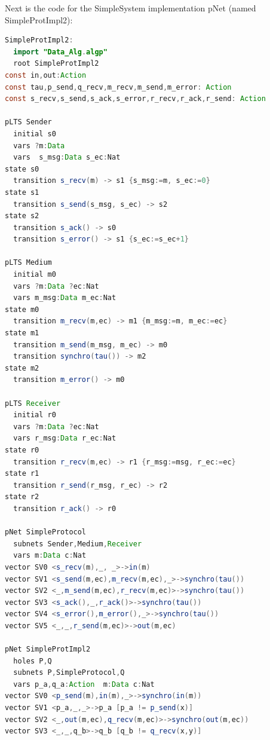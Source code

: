\documentclass{lmcs}
\begin{document}
Next is the code for the SimpleSystem implementation pNet (named SimpleProtImpl2):
\medskip
\begin{lstlisting}[basicstyle=\scriptsize\ttfamily, language=java, frame=single]
SimpleProtImpl2:
  import "Data_Alg.algp"
  root SimpleProtImpl2
const in,out:Action
const tau,p_send,q_recv,m_recv,m_send,m_error: Action
const s_recv,s_send,s_ack,s_error,r_recv,r_ack,r_send: Action

pLTS Sender
  initial s0
  vars ?m:Data
  vars  s_msg:Data s_ec:Nat
state s0
  transition s_recv(m) -> s1 {s_msg:=m, s_ec:=0}
state s1
  transition s_send(s_msg, s_ec) -> s2 
state s2
  transition s_ack() -> s0
  transition s_error() -> s1 {s_ec:=s_ec+1}

pLTS Medium
  initial m0
  vars ?m:Data ?ec:Nat
  vars m_msg:Data m_ec:Nat
state m0
  transition m_recv(m,ec) -> m1 {m_msg:=m, m_ec:=ec}
state m1
  transition m_send(m_msg, m_ec) -> m0 
  transition synchro(tau()) -> m2
state m2
  transition m_error() -> m0

pLTS Receiver
  initial r0
  vars ?m:Data ?ec:Nat
  vars r_msg:Data r_ec:Nat
state r0
  transition r_recv(m,ec) -> r1 {r_msg:=msg, r_ec:=ec}
state r1
  transition r_send(r_msg, r_ec) -> r2
state r2
  transition r_ack() -> r0

pNet SimpleProtocol
  subnets Sender,Medium,Receiver
  vars m:Data c:Nat
vector SV0 <s_recv(m),_, _>->in(m)
vector SV1 <s_send(m,ec),m_recv(m,ec),_>->synchro(tau())
vector SV2 <_,m_send(m,ec),r_recv(m,ec)>->synchro(tau())
vector SV3 <s_ack(),_,r_ack()>->synchro(tau())
vector SV4 <s_error(),m_error(),_>->synchro(tau())
vector SV5 <_,_,r_send(m,ec)>->out(m,ec)

pNet SimpleProtImpl2
  holes P,Q
  subnets P,SimpleProtocol,Q
  vars p_a,q_a:Action  m:Data c:Nat
vector SV0 <p_send(m),in(m),_>->synchro(in(m))
vector SV1 <p_a,_,_>->p_a [p_a != p_send(x)]
vector SV2 <_,out(m,ec),q_recv(m,ec)>->synchro(out(m,ec))
vector SV3 <_,_,q_b>->q_b [q_b != q_recv(x,y)]
\end{lstlisting}

\end{document}
